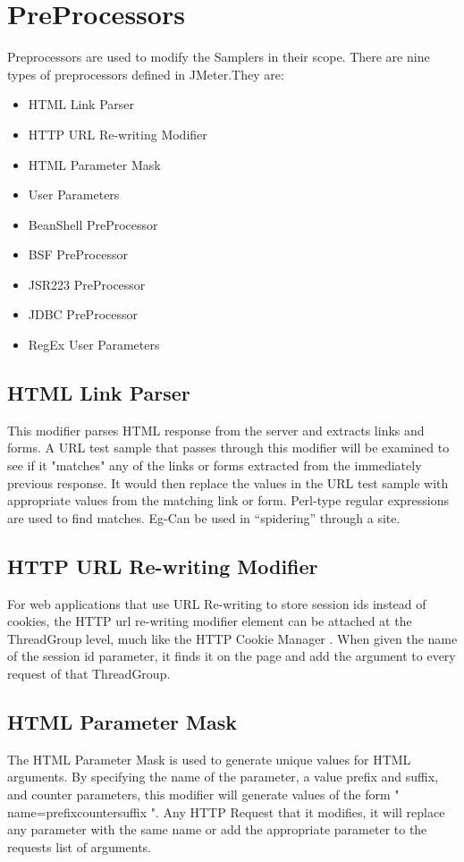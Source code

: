 \documentclass[12pt]{book}
\begin{document}
\section{PreProcessors}
  Preprocessors are used to modify the Samplers in their scope. There are nine types of preprocessors defined in JMeter.They are:\cite{Ehh} \cite{Jmeter} \cite{Manual}
  \begin{itemize}
   \item HTML Link Parser 
   \item HTTP URL Re-writing Modifier 
   \item HTML Parameter Mask 
   \item User Parameters 
   \item BeanShell PreProcessor 
   \item BSF PreProcessor 
   \item JSR223 PreProcessor 
   \item JDBC PreProcessor 
   \item RegEx User Parameters 
  \end{itemize}

  \subsection{HTML Link Parser}
  This modifier parses HTML response from the server and extracts links and forms. A URL test sample that passes through this modifier will 
  be examined to see if it "matches" any of the links or forms extracted from the immediately previous response. It would then replace the values
  in the URL test sample with appropriate values from the matching link or form. Perl-type regular expressions are used to find matches. Eg-Can be 
  used in “spidering” through a site. 
  
  \subsection{HTTP URL Re-writing Modifier}
  For web applications that use URL Re-writing to store session ids instead of cookies, the HTTP url re-writing modifier element can be attached 
  at the ThreadGroup level, much like the HTTP Cookie Manager . When given the name of the session id parameter, it finds it on the page and add
  the argument to every request of that ThreadGroup. 
  
  \subsection{HTML Parameter Mask}
  The HTML Parameter Mask is used to generate unique values for HTML arguments. By specifying the name of the parameter, a value prefix and suffix,
  and counter parameters, this modifier will generate values of the form " name=prefixcountersuffix ". Any HTTP Request that it modifies, it will replace 
  any parameter with the same name or add the appropriate parameter to the requests list of arguments. 
  
\end{document}
